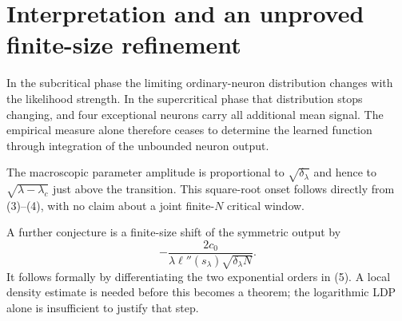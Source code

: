 \documentclass[11pt]{article}
\begin{document}
\section{Interpretation and an unproved finite-size refinement}
In the subcritical phase the limiting ordinary-neuron distribution
changes with the likelihood strength. In the supercritical phase
that distribution stops changing, and four exceptional neurons carry
all additional mean signal. The empirical measure alone therefore
ceases to determine the learned function through integration of the
unbounded neuron output.

The macroscopic parameter amplitude is proportional to
$\sqrt{\delta_\lambda}$ and hence to
$\sqrt{\lambda-\lambda_c}$ just above the transition.
This square-root onset follows directly from (3)--(4), with no claim
about a joint finite-$N$ critical window.

A further conjecture is a finite-size shift of the symmetric output
by
\[
 -\frac{2c_0}{\lambda\ell''(s_\lambda)
                    \sqrt{\delta_\lambda N}}.
\]
It follows formally by differentiating the two exponential orders in
(5). A local density estimate is needed before this becomes a theorem;
the logarithmic LDP alone is insufficient to justify that step.
\end{document}
